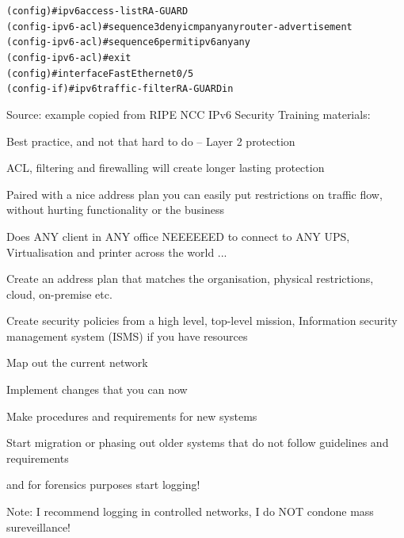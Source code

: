 \documentclass[Screen16to9,17pt]{foils}
\begin{document}


\begin{alltt}\small
 (config)#ipv6 access-list RA-GUARD
 (config-ipv6-acl)#sequence 3 deny icmp any any router-advertisement
 (config-ipv6-acl)#sequence 6 permit ipv6 any any
 (config-ipv6-acl)#exit
 (config)#interface FastEthernet0/5
 (config-if)#ipv6 traffic-filter RA-GUARD in
\end{alltt}
Source: example copied from RIPE NCC IPv6 Security Training materials:\\

\begin{list2}
\item Best practice, and not that hard to do -- Layer 2 protection
\item ACL, filtering and firewalling will create longer lasting protection
\item Paired with a nice address plan you can easily put restrictions on traffic flow, without hurting functionality or the business
\item Does ANY client in ANY office NEEEEEED to connect to ANY UPS, Virtualisation and printer across the world ...
\end{list2}






\begin{list2}
\item Create an address plan that matches the organisation, physical restrictions, cloud, on-premise etc.
\item Create security policies from a high level, top-level mission, Information security management system (ISMS) if you have resources
\item Map out the current network
\item Implement changes that you can now
\item Make procedures and requirements for new systems
\item Start migration or phasing out older systems that do not follow guidelines and requirements
\end{list2}

and for forensics purposes start logging!


Note: I recommend logging in controlled networks, I do NOT condone mass sureveillance!
\end{document}

